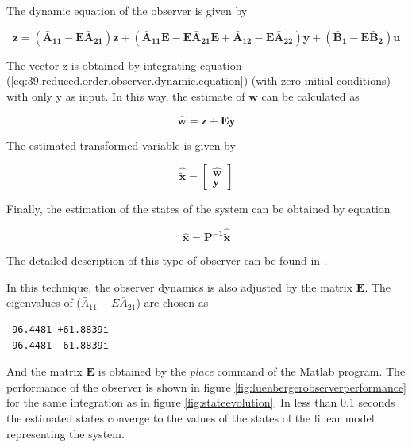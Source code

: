 \documentclass[sublist,a4paper,twoside,11pt]{article}
\begin{document}
The dynamic equation of the observer is given by

\begin{equation}\label{eq:39.reduced.order.observer.dynamic.equation}
\mathbf{
\dot{z} = \left(\bar{A}_{11} - E\bar{A}_{21} \right)z +
\left(\bar{A}_{11}E - E\bar{A}_{21}E +\bar{A}_{12}- E \bar{A}_{22}\right)y + 
\left(\bar{B}_{1}- E\bar{B}_{2}\right)u 
}
\end{equation}


The vector z is obtained by integrating equation (\ref{eq:39.reduced.order.observer.dynamic.equation}) (with zero initial conditions) with only y as input. In this way, the estimate of $\mathbf{w}$ can be calculated as 

\begin{equation}
\mathbf{\hat{w} = z+Ey}
\end{equation}

The estimated transformed variable is given by

\begin{equation}\mathbf{\hat{\tilde{x}}=
	\begin{bmatrix}
	\hat{w}\\
	y
	\end{bmatrix}}
\end{equation}


Finally, the estimation of the states of the system can be obtained by equation

\begin{equation}
\mathbf{
	\hat{x}= P^{-1}\hat{\tilde{x}}
}
\end{equation}

The detailed description of this type of observer can be found in \cite{Luenberger1979introduction}. %

In this technique, the observer dynamics is also adjusted by the matrix $\mathbf{E}$. The eigenvalues of ($\bar{A}_11-E \bar{A} _{21}$) are chosen as
\begin{verbatim}
-96.4481 +61.8839i
-96.4481 -61.8839i
\end{verbatim}

And the matrix $\mathbf{E}$ is obtained by the \emph{place} command of the Matlab program.
The performance of the observer is shown in figure \ref{fig:luenbergerobserverperformance} for the same integration as in figure \ref{fig:stateevolution}. In less than 0.1 seconds the estimated states converge to the values of the states of the linear model representing the system. 
\end{document}
